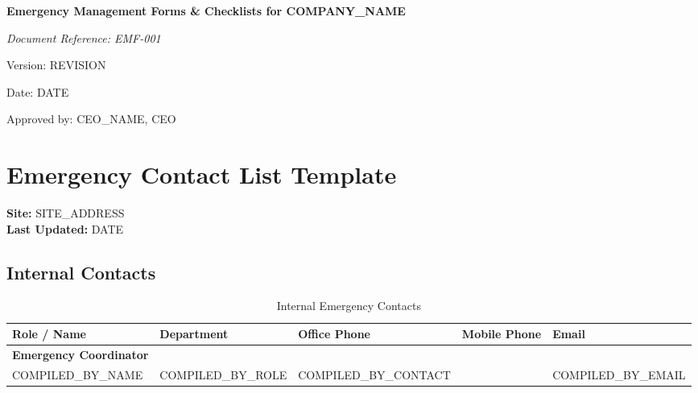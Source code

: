 \documentclass[12pt]{article}
\begin{document}
\begin{titlepage}
    \centering
    \vspace*{2cm}
    {\LARGE\bfseries Emergency Management Forms \& Checklists for {{COMPANY_NAME}}\par}
    \vspace{1cm}
    {\large\itshape Document Reference: EMF-001\par}
    \vspace{0.5cm}
    {\normalsize Version: {{REVISION}}\par}
    \vspace{0.5cm}
    {\normalsize Date: {{DATE}}\par}
    \vspace{2cm}
    {\normalsize Approved by: {{CEO_NAME}}, CEO\par}
\end{titlepage}

\section{Emergency Contact List Template}

\textbf{Site:} {{SITE_ADDRESS}}\\
\textbf{Last Updated:} {{DATE}}

\subsection{Internal Contacts}
\begin{table}[h]
    \centering
    \begin{tabular}{p{4cm}p{3cm}p{3cm}p{3cm}p{3cm}}
        \toprule
        \textbf{Role / Name} & \textbf{Department} & \textbf{Office Phone} & \textbf{Mobile Phone} & \textbf{Email} \\
        \midrule
        \textbf{Emergency Coordinator} & & & & \\
        {{COMPILED_BY_NAME}} & {{COMPILED_BY_ROLE}} & {{COMPILED_BY_CONTACT}} & & {{COMPILED_BY_EMAIL}} \\
        \bottomrule
    \end{tabular}
    \caption{Internal Emergency Contacts}
\end{table}
\end{document}
